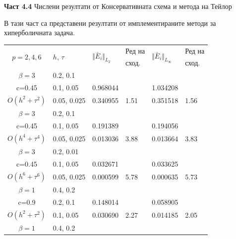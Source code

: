 \documentclass[a5paper]{article}
\theoremstyle{remark}
\begin{document}
\begin{large}
\textbf{Част 4.4} Числени резултати от Консервативната схема и метода на Тейлор

В тази част са представени резултати от имплементираните методи за хиперболичната задача.
\begin{table}[ht]
\begin{small}
\centering
\small
		\begin{tabular}{||c|l|ll|ll||}
			\hline
			\hline


      \multirow{2  }{*}{$p=2,4,6$}        & \multirow{2  }{*}{$h$, $\tau$}  &	\multirow{2  }{*}{  $\Vert \bar E_i \Vert_{L_2} $ } 	&Ред на & \multirow{2  }{*}{  $\Vert \bar E_i \Vert_{L_\infty}$ }	&Ред на   \\
	                                        &                                                &    										&  сход. & 										& сход. \\
\hline 
\hline 
  $\beta=3$               &0.2, 0.1      &              	&           &                	&      \\
   c=0.45                   &0.1, 0.05    &0.968044  	&           &1.034208   &       \\
 $O(h^2 + \tau^ 2)$ 	&0.05, 0.025	& 0.340955 	& 1.51    &0.351518  	&  1.56      \\
\hline 
  $\beta=3$               &0.2, 0.1      &              	&          	&                 &      \\
   c=0.45                   &0.1, 0.05    &0.191389 	&          	&0.194056   	&       \\
$O(h^4+ \tau^4)$	&0.05, 0.025	&0.013036 	& 3.88   	&0.013664   	& 3.83       \\
\hline 
  $\beta=3$               &0.2, 0.01    &                	&          	&                 &      \\
     c=0.45                 &0.1, 0.05    &0.032671 	&          	& 0.033625  	&       \\
  $O(h^6+ \tau^6)$ 	&0.05, 0.025	&0.000599 	&5.78    	& 0.000635  	& 5.73       \\
\hline
\hline 
       $\beta=1$        	&0.4, 0.2      &             	&            &           &   \\
           c=0.9    		&0.2, 0.1      &  0.148014 	&            &0.058905 &   \\
  $O(h^2+ \tau^2)$  	&0.1, 0.05   	& 0.030690  	&2.27  	 &0.014185   & 2.05 \\
\hline
      $\beta=1$           &0.4, 0.2    	&            	&               &             &    \\

\end{tabular}
\end{small}
\end{table}
\end{large}
\end{document}
